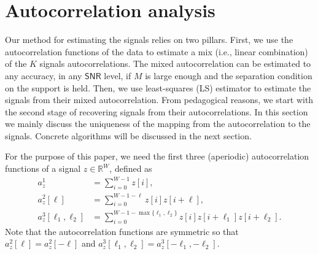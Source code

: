 \documentclass[english,11pt]{article}
\numberwithin{equation}{section}
\theoremstyle{plain}
\theoremstyle{definition}
\theoremstyle{remark}
\theoremstyle{plain}
\theoremstyle{remark}
\theoremstyle{plain}
\theoremstyle{plain}
\newcommand{\SNR}{{\textsf{SNR}}}
\begin{document}
\section{Autocorrelation analysis}   \label{sec:autocorrelation}

Our method for estimating the signals relies on two pillars. 
First, we use the autocorrelation functions of the data to estimate a mix (i.e., linear combination) of the $K$ signals autocorrelations. The mixed autocorrelation can be estimated to any accuracy, in any $\SNR$ level, if $M$ is large enough and the separation condition on the support is held. Then, we use least-squares (LS) estimator to estimate the signals from their mixed autocorrelation. From pedagogical reasons, we start with the second stage of recovering signals from their autocorrelations. In this section we mainly discuss the uniqueness of the mapping from the autocorrelation to the signals. Concrete algorithms will be discussed in the next section.

For the purpose of this paper, we need the first three (aperiodic) autocorrelation functions of a signal $z\in\mathbb{R}^W$, defined as
\begin{align} \label{eq:autocorrelations}
a_z^1 &= \sum_{i=0}^{W-1} z[i], \nonumber\\
a_z^2[\ell] &= \sum_{i=0}^{W-1-\ell} z[i]z[i+\ell], \nonumber\\
a_z^3[\ell_1,\ell_2] &= \sum_{i=0}^{W-1-\max\{\ell_1,\ell_2\}} z[i]z[i+\ell_1]z[i+\ell_2]. 
\end{align}
Note that the autocorrelation functions are symmetric so that $a_z^2[\ell] = a_z^2[-\ell]$ and $a_z^3[\ell_1,\ell_2] = a_z^3[-\ell_1,-\ell_2]$. 
\end{document}
